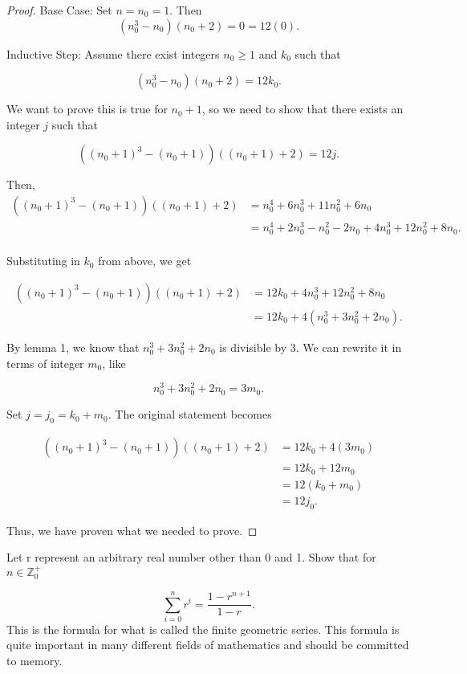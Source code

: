 \documentclass[12pt]{article}
\newenvironment{problem}[2][Problem]{\begin{trivlist}
\item[\hskip \labelsep {\bfseries #1}\hskip \labelsep {\bfseries #2.}]}{\end{trivlist}}
\begin{document}
\begin{proof} Base Case: Set $n = n_0 = 1$. Then
    $$(n_0^3 - n_0)(n_0 + 2) = 0 = 12(0).$$

    \noindent Inductive Step: Assume there exist integers $n_0 \geq 1$ and $k_0$ such that

    $$(n_0^3 - n_0)(n_0 + 2) = 12k_0.$$

    We want to prove this is true for $n_0 + 1$, so we need to show that there exists an integer $j$ such that

    $$((n_0+1)^3 - (n_0+1))((n_0+1) + 2) = 12j.$$

    Then,
    \begin{align*}
        ((n_0+1)^3 - (n_0+1))((n_0+1) + 2) & = n_0^4 + 6n_0^3 + 11n_0^2 + 6n_0 \\
        & = n_0^4 + 2n_0^3 - n_0^2 - 2n_0 + 4n_0^3 + 12n_0^2+8n_0.\\
    \end{align*}

    Substituting in $k_0$ from above, we get

    \begin{align*}
        ((n_0+1)^3 - (n_0+1))((n_0+1) + 2) & = 12k_0 + 4n_0^3 + 12n_0^2 + 8n_0 \\
        & = 12k_0 + 4(n_0^3 + 3n_0^2 + 2n_0).
    \end{align*}

    By lemma 1, we know that $n_0^3 + 3n_0^2 + 2n_0$ is divisible by 3. We can rewrite it in terms of integer $m_0$, like

    $$n_0^3 + 3n_0^2 + 2n_0 = 3m_0.$$
    
    Set $j = j_0 = k_0 + m_0$. The original statement becomes

    \begin{align*}
        ((n_0+1)^3 - (n_0+1))((n_0+1) + 2) & = 12k_0 + 4(3m_0) \\
        & = 12k_0 + 12m_0 \\
        & = 12(k_0 + m_0) \\
        & = 12j_0.
    \end{align*}

    Thus, we have proven what we needed to prove.

\end{proof}





\newpage
\begin{problem}{2}
    Let r represent an arbitrary real number other than 0 and 1. Show that for $n \in \mathbb{Z}_0^+$

    $$\sum_{i=0}^{n} r^i = \frac{1 - r^{n+1}}{1 - r}.$$
    This is the formula for what is called the finite geometric series. This formula is quite important in many different fields of mathematics and should be committed to memory.

\end{problem}
\end{document}
